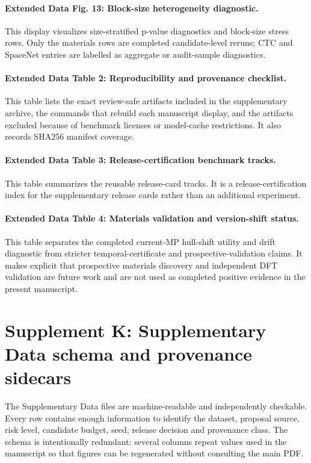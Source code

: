 \documentclass[11pt]{article}
\begin{document}
\paragraph{Extended Data Fig. 13: Block-size heterogeneity diagnostic.}
This display visualizes size-stratified p-value diagnostics and block-size stress rows.
Only the materials rows are completed candidate-level reruns; CTC and SpaceNet entries are labelled as aggregate or audit-sample diagnostics.

\paragraph{Extended Data Table 2: Reproducibility and provenance checklist.}
This table lists the exact review-safe artifacts included in the supplementary archive, the commands that rebuild each manuscript display, and the artifacts excluded because of benchmark licenses or model-cache restrictions.
It also records SHA256 manifest coverage.

\paragraph{Extended Data Table 3: Release-certification benchmark tracks.}
This table summarizes the reusable release-card tracks.
It is a release-certification index for the supplementary release cards rather than an additional experiment.

\paragraph{Extended Data Table 4: Materials validation and version-shift status.}
This table separates the completed current-MP hull-shift utility and drift diagnostic from stricter temporal-certificate and prospective-validation claims.
It makes explicit that prospective materials discovery and independent DFT validation are future work and are not used as completed positive evidence in the present manuscript.

\clearpage

\section*{Supplement K: Supplementary Data schema and provenance sidecars}

The Supplementary Data files are machine-readable and independently checkable.
Every row contains enough information to identify the dataset, proposal source, risk level, candidate budget, seed, release decision and provenance class.
The schema is intentionally redundant: several columns repeat values used in the manuscript so that figures can be regenerated without consulting the main PDF.
\end{document}
